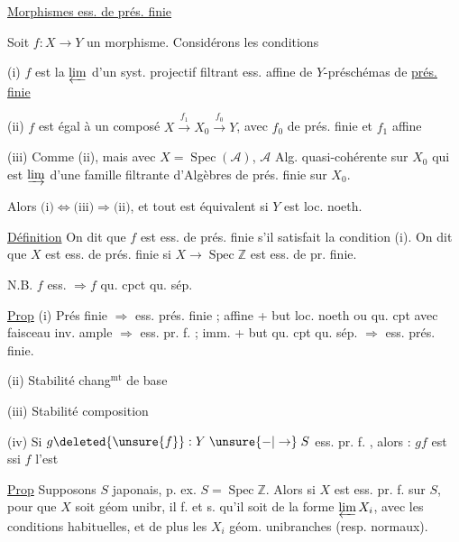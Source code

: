 \uline{Morphismes ess.  de prés. finie}

Soit $f:X\longrightarrow Y$ un morphisme. Considérons les conditions

(i) $f$ est la $\varprojlim$ d'un syst. projectif filtrant ess. affine de $Y$-préschémas de \uline{prés. finie}

(ii) $f$ est égal à un composé $X\xrightarrow{f_1}X_0\xrightarrow{f_0}Y$, avec $f_0$ de prés. finie et $f_1$ affine

(iii) Comme (ii), mais avec $X=\operatorname{Spec}(\mathcal A)$, $\mathcal A$ Alg. quasi-cohérente sur $X_0$ qui est $\varinjlim$ d'une famille filtrante d'Algèbres de prés. finie sur $X_0$.

Alors $\text{(i)}\Leftrightarrow\text{(iii)}\Longrightarrow\text{(ii)}$, et tout est équivalent si $Y$ est loc. noeth.

\uline{Définition} On dit que $f$ est ess. de prés. finie s'il satisfait la condition (i). On dit que $X$ est ess. de prés. finie si $X\longrightarrow\operatorname{Spec}\mathbb{Z}$ est ess. de pr. finie.

N.B.  $f$ ess.  $\Rightarrow f$ qu. cpct qu. sép.

\uline{Prop} (i) Prés finie $\Rightarrow$ ess. prés. finie ; affine + but loc. noeth ou qu. cpt  avec faisceau inv. ample $\Longrightarrow$ ess. pr. f. ;  imm.  + but qu. cpt qu. sép. $\Longrightarrow$ ess. prés. finie.

(ii) Stabilité chang$^{\mathrm{mt}}$ de base

(iii) Stabilité composition

(iv) Si $g\deleted{\unsure{f}}:Y\mathrel{\unsure{-|\to}}S$ ess. pr. f. , alors : $gf$  est  ssi $f$ l'est

\uline{Prop} Supposons $S$  japonais, p. ex. $S=\operatorname{Spec}\mathbb Z$. Alors si $X$ est  ess. pr. f. sur $S$, pour que $X$ soit géom unibr, il f. et s. qu'il soit de la forme $\varprojlim X_i$, avec les conditions habituelles, et de plus les $X_i$ géom. unibranches (resp. normaux).
